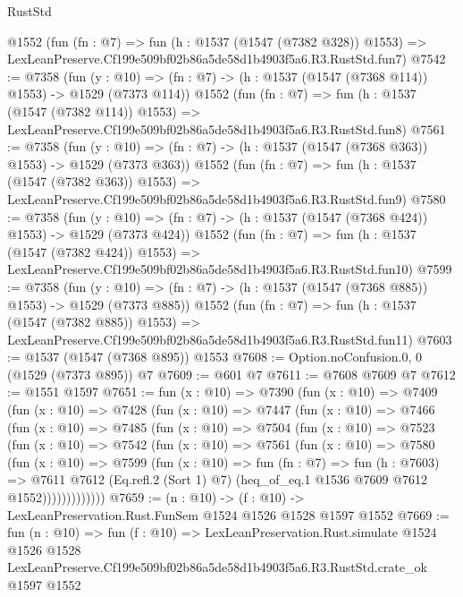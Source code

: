 \begin{lexlean}{RustStd}
\begin{coremodule}
    @1552
    (fun (fn : @7) =>
    fun (h : @1537 (@1547 (@7382 @328)) @1553) =>
    LexLeanPreserve.Cf199e509bf02b86a5de58d1b4903f5a6.R3.RustStd.fun7)
@7542 := @7358
    (fun (y : @10) => (fn : @7) -> (h : @1537 (@1547 (@7368 @114)) @1553) -> @1529 (@7373 @114))
    @1552
    (fun (fn : @7) =>
    fun (h : @1537 (@1547 (@7382 @114)) @1553) =>
    LexLeanPreserve.Cf199e509bf02b86a5de58d1b4903f5a6.R3.RustStd.fun8)
@7561 := @7358
    (fun (y : @10) => (fn : @7) -> (h : @1537 (@1547 (@7368 @363)) @1553) -> @1529 (@7373 @363))
    @1552
    (fun (fn : @7) =>
    fun (h : @1537 (@1547 (@7382 @363)) @1553) =>
    LexLeanPreserve.Cf199e509bf02b86a5de58d1b4903f5a6.R3.RustStd.fun9)
@7580 := @7358
    (fun (y : @10) => (fn : @7) -> (h : @1537 (@1547 (@7368 @424)) @1553) -> @1529 (@7373 @424))
    @1552
    (fun (fn : @7) =>
    fun (h : @1537 (@1547 (@7382 @424)) @1553) =>
    LexLeanPreserve.Cf199e509bf02b86a5de58d1b4903f5a6.R3.RustStd.fun10)
@7599 := @7358
    (fun (y : @10) => (fn : @7) -> (h : @1537 (@1547 (@7368 @885)) @1553) -> @1529 (@7373 @885))
    @1552
    (fun (fn : @7) =>
    fun (h : @1537 (@1547 (@7382 @885)) @1553) =>
    LexLeanPreserve.Cf199e509bf02b86a5de58d1b4903f5a6.R3.RustStd.fun11)
@7603 := @1537 (@1547 (@7368 @895)) @1553
@7608 := Option.noConfusion.{0, 0} (@1529 (@7373 @895)) @7
@7609 := @601 @7
@7611 := @7608 @7609 @7
@7612 := @1551 @1597
@7651 := fun (x : @10) =>
  @7390
    (fun (x : @10) =>
    @7409
      (fun (x : @10) =>
      @7428
        (fun (x : @10) =>
        @7447
          (fun (x : @10) =>
          @7466
            (fun (x : @10) =>
            @7485
              (fun (x : @10) =>
              @7504
                (fun (x : @10) =>
                @7523
                  (fun (x : @10) =>
                  @7542
                    (fun (x : @10) =>
                    @7561
                      (fun (x : @10) =>
                      @7580
                        (fun (x : @10) =>
                        @7599
                          (fun (x : @10) =>
                          fun (fn : @7) =>
                          fun (h : @7603) =>
                          @7611
                            @7612
                            (Eq.refl.{2} (Sort 1) @7)
                            (heq_of_eq.{1} @1536 @7609 @7612 @1552)))))))))))))
@7659 := (n : @10) -> (f : @10) -> LexLeanPreservation.Rust.FunSem @1524 @1526 @1528 @1597 @1552
@7669 := fun (n : @10) =>
  fun (f : @10) =>
  LexLeanPreservation.Rust.simulate
    @1524
    @1526
    @1528
    LexLeanPreserve.Cf199e509bf02b86a5de58d1b4903f5a6.R3.RustStd.crate_ok
    @1597
    @1552
\end{coremodule}
\end{lexlean}
